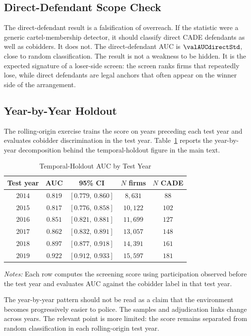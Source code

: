 \subsection{Direct-Defendant Scope Check}
\label{app:direct_scope_v18}

The direct-defendant result is a falsification of overreach. If
the statistic were a generic cartel-membership detector, it
should classify direct CADE defendants as well as cobidders. It
does not. The direct-defendant AUC is $\valAUCdirectStd$, close
to random classification. The result is not a weakness to be
hidden. It is the expected signature of a loser-side screen: the
screen ranks firms that repeatedly lose, while direct defendants
are legal anchors that often appear on the winner side of the
arrangement.

\subsection{Year-by-Year Holdout}
\label{app:year_holdout_v18}

The rolling-origin exercise trains the score on years preceding
each test year and evaluates cobidder discrimination in the test
year. Table~\ref{tab:temporal_holdout_year_v18} reports the
year-by-year decomposition behind the temporal-holdout figure in
the main text.

\begin{table}[htbp]
\centering
\caption{Temporal-Holdout AUC by Test Year}
\label{tab:temporal_holdout_year_v18}
\footnotesize
\begin{threeparttable}
\begin{tabular}{ccccc}
\toprule
Test year & AUC & 95\% CI & $N$ firms & $N$ CADE \\
\midrule
$2014$ & $0.819$ & $[0.779,\ 0.860]$ & $8{,}631$ & $88$ \\
$2015$ & $0.817$ & $[0.776,\ 0.858]$ & $10{,}122$ & $102$ \\
$2016$ & $0.851$ & $[0.821,\ 0.881]$ & $11{,}699$ & $127$ \\
$2017$ & $0.862$ & $[0.832,\ 0.891]$ & $13{,}057$ & $148$ \\
$2018$ & $0.897$ & $[0.877,\ 0.918]$ & $14{,}391$ & $161$ \\
$2019$ & $0.922$ & $[0.912,\ 0.933]$ & $15{,}597$ & $181$ \\
\bottomrule
\end{tabular}
\begin{tablenotes}
\footnotesize
\item \textit{Notes:} Each row computes the screening score using
participation observed before the test year and evaluates AUC
against the cobidder label in that test year.
\end{tablenotes}
\end{threeparttable}
\end{table}

The year-by-year pattern should not be read as a claim that the
environment becomes progressively easier to police. The samples
and adjudication links change across years. The relevant point is
more limited: the score remains separated from random
classification in each rolling-origin test year.
